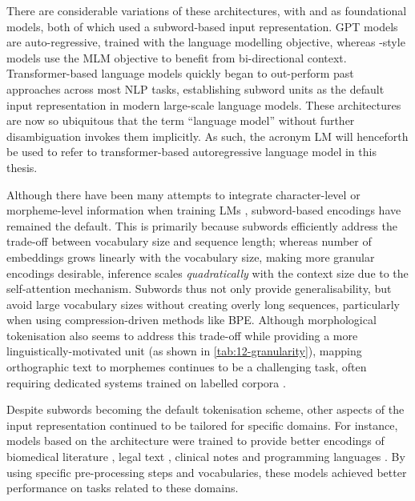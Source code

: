 There are considerable variations of these architectures, with  \citep{radford2018gpt1} and \bert \citep{devlin2019bert} as foundational models, both of which used a subword-based input representation. GPT models are auto-regressive, trained with the language modelling objective, whereas \bert-style models use the MLM objective to benefit from bi-directional context. Transformer-based language models quickly began to out-perform past approaches across most NLP tasks, establishing subword units as the default input representation in modern large-scale language models. These architectures are now so ubiquitous that the term ``language model'' without further disambiguation invokes them implicitly. As such, the acronym LM will henceforth be used to refer to transformer-based autoregressive language model in this thesis.

Although there have been many attempts to integrate character-level or morpheme-level information when training LMs \citep[e.g.][]{ma-etal-2020-charbert, nzeyimana-niyongabo-rubungo-2022-kinyabert}, subword-based encodings have remained the default. This is primarily because subwords efficiently address the trade-off between vocabulary size and sequence length; whereas number of embeddings grows linearly with the vocabulary size, making more granular encodings desirable, inference scales \emph{quadratically} with the context size due to the self-attention mechanism. Subwords thus not only provide generalisability, but avoid large vocabulary sizes without creating overly long sequences, particularly when using compression-driven methods like BPE. Although morphological tokenisation also seems to address this trade-off while providing a more linguistically-motivated unit (as shown in \cref{tab:12-granularity}), mapping orthographic text to morphemes continues to be a challenging task, often requiring dedicated systems trained on labelled corpora \citep{batsuren-etal-2022-sigmorphon}. 

Despite subwords becoming the default tokenisation scheme, other aspects of the input representation continued to be tailored for specific domains. For instance, models based on the \bert architecture were trained to provide better encodings of biomedical literature \citep[;][]{lee2020biobert}, legal text \citep[;][]{chalkidis2020legal}, clinical notes \citep[;][]{alsentzer2019publicly} and programming languages \citep[;][]{feng-etal-2020-codebert}. By using specific pre-processing steps and vocabularies, these models achieved better performance on tasks related to these domains.

